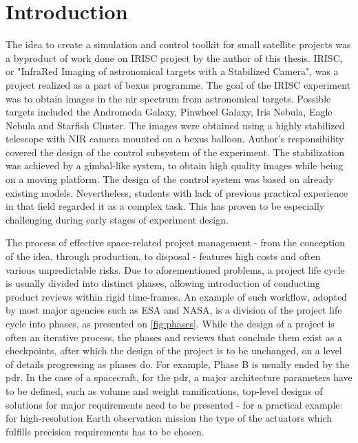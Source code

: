 \section{Introduction}\label{sec:introduction}
    The idea to create a simulation and control toolkit for small satellite projects was a byproduct of work done on IRISC project by the author of this thesis. IRISC, or "InfraRed Imaging of astronomical targets with a Stabilized Camera", was a project realized as a part of \ac{bexus} programme. The goal of the IRISC experiment was to obtain images in the \ac{nir} spectrum from astronomical targets. Possible targets included the Andromeda Galaxy, Pinwheel Galaxy, Iris Nebula, Eagle Nebula and Starfish Cluster. The images were obtained using a highly stabilized telescope with NIR camera mounted on a \ac{bexus} balloon. Author's responsibility covered the design of the control subsystem of the experiment. The stabilization was achieved by a gimbal-like system, to obtain high quality images while being on a moving platform\cite{irisc-sed}. The design of the control system was based on already existing models. Nevertheless, students with lack of previous practical experience in that field regarded it as a complex task. This has proven to be especially challenging during early stages of experiment design.

    The process of effective space-related project management - from the conception of the idea, through production, to disposal - features high costs and often various unpredictable risks. Due to aforementioned problems, a project life cycle is usually divided into distinct phases, allowing introduction of conducting product reviews within rigid time-frames. An example of such workflow, adopted by most major agencies such as ESA\cite{managementecss} and NASA\cite{kapurch2010nasa}, is a division of the project life cycle into phases, as presented on \autoref{fig:phases}. While the design of a project is often an iterative process, the phases and reviews that conclude them exist as a checkpoints, after which the design of the project is to be unchanged, on a level of details progressing as phases do. For example, Phase B is usually ended by the \ac{pdr}. In the case of a spacecraft, for the \ac{pdr}, a major architecture parameters have to be defined, such as volume and weight ramifications, top-level designs of solutions for major requirements need to be presented - for a practical example: for high-resolution Earth observation mission the type of the actuators which fulfills precision requirements has to be chosen.

